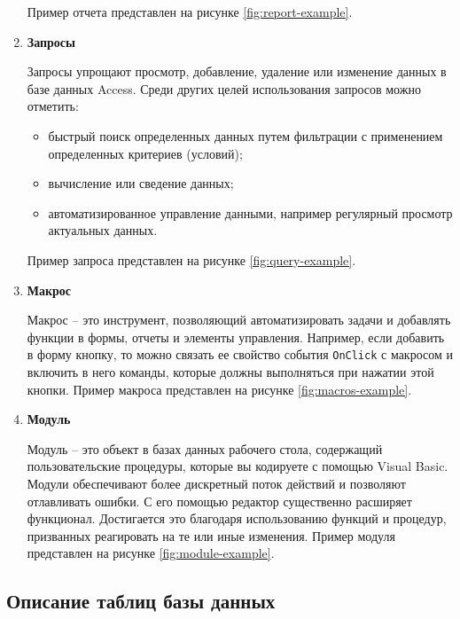 \begin{enumerate}
    \tab Пример отчета представлен на рисунке \ref{fig:report-example}.
    

    \item \textbf{Запросы}
    
    \tab Запросы упрощают просмотр, добавление, удаление или изменение данных в базе данных Access. Среди других целей использования запросов можно отметить:
    \begin{itemize}
        \item быстрый поиск определенных данных путем фильтрации с применением определенных критериев (условий);
        \item вычисление или сведение данных;
        \item автоматизированное управление данными, например регулярный просмотр актуальных данных.
    \end{itemize}
    
    \tab Пример запроса представлен на рисунке \ref{fig:query-example}.


    \item \textbf{Макрос}
    
    \tab Макрос -- это инструмент, позволяющий автоматизировать задачи и добавлять функции в формы, отчеты и элементы управления. Например, если добавить в форму кнопку, то можно связать ее свойство события \texttt{OnClick} с макросом и включить в него команды, которые должны выполняться при нажатии этой кнопки. Пример макроса представлен на рисунке \ref{fig:macros-example}.


    \item \textbf{Модуль}
    
    \tab Модуль -- это объект в базах данных рабочего стола, содержащий пользовательские процедуры, которые вы кодируете с помощью Visual Basic. Модули обеспечивают более дискретный поток действий и позволяют отлавливать ошибки. С его помощью редактор существенно расширяет функционал. Достигается это благодаря использованию функций и процедур, призванных реагировать на те или иные изменения. Пример модуля представлен на рисунке \ref{fig:module-example}.
\end{enumerate}


\subsection{Описание таблиц базы данных}


